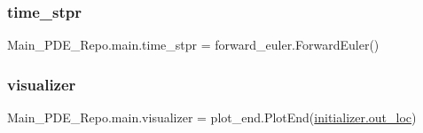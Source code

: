 \subsubsection{\texorpdfstring{time\+\_\+stpr}{time\_stpr}}
{\footnotesize\ttfamily Main\+\_\+\+P\+D\+E\+\_\+\+Repo.\+main.\+time\+\_\+stpr = forward\+\_\+euler.\+Forward\+Euler()}

\mbox{\label{namespaceMain__PDE__Repo_1_1main_a58d58c03728c5267032735d487a00122}} 
\subsubsection{\texorpdfstring{visualizer}{visualizer}}
{\footnotesize\ttfamily Main\+\_\+\+P\+D\+E\+\_\+\+Repo.\+main.\+visualizer = plot\+\_\+end.\+Plot\+End(\hyperlink{namespaceMain__PDE__Repo_1_1initializer_acf6a435968a90051222f233d914c5397}{initializer.\+out\+\_\+loc})}

